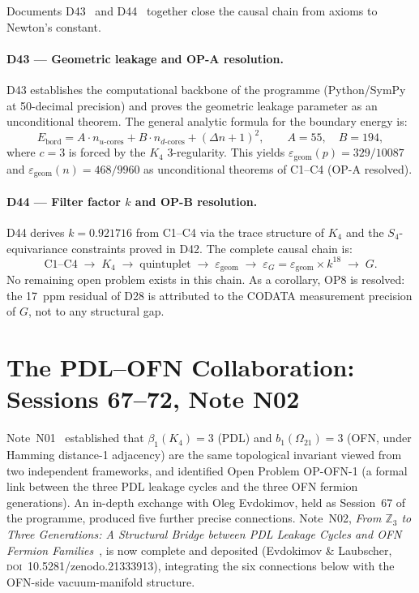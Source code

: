 \documentclass[11pt,a4paper]{article}
\theoremstyle{plain}
\theoremstyle{definition}
\theoremstyle{remark}
\newcommand{\Kfour}{K_4}
\begin{document}
Documents D43~\cite{D43} and D44~\cite{D44} together close the causal chain from axioms to Newton's constant.

\paragraph{D43 --- Geometric leakage and OP-A resolution.} D43 establishes the computational backbone of the programme (Python/SymPy at 50-decimal precision) and proves the geometric leakage parameter as an unconditional theorem. The general analytic formula for the boundary energy is:
\begin{equation}
E_{\mathrm{bord}} = A \cdot n_{u\text{-cores}} + B \cdot n_{d\text{-cores}} + (\Delta n+1)^2, \qquad A = 55,\quad B = 194,
\end{equation}
where $c=3$ is forced by the $K_4$ 3-regularity. This yields $\varepsilon_{\mathrm{geom}}(p) = 329/10087$ and $\varepsilon_{\mathrm{geom}}(n) = 468/9960$ as unconditional theorems of C1--C4 (OP-A resolved).

\paragraph{D44 --- Filter factor $k$ and OP-B resolution.} D44 derives $k = 0.921716$ from C1--C4 via the trace structure of $K_4$ and the $S_4$-equivariance constraints proved in D42. The complete causal chain is:
\begin{equation*}
\text{C1--C4} \;\to\; K_4 \;\to\; \text{quintuplet} \;\to\; \varepsilon_{\mathrm{geom}} \;\to\; \varepsilon_G = \varepsilon_{\mathrm{geom}} \times k^{18} \;\to\; G.
\end{equation*}
No remaining open problem exists in this chain. As a corollary, OP8 is resolved: the 17~ppm residual of D28 is attributed to the CODATA measurement precision of $G$, not to any structural gap.

\section{The PDL--OFN Collaboration: Sessions 67--72, Note N02}
\label{sec:PDLOFN}

Note~N01~\cite{N01} established that $\beta_1(\Kfour)=3$ (PDL) and $b_1(\Omega_{21})=3$ (OFN, under Hamming distance-1 adjacency) are the same topological invariant viewed from two independent frameworks, and identified Open Problem OP-OFN-1 (a formal link between the three PDL leakage cycles and the three OFN fermion generations). An in-depth exchange with Oleg Evdokimov, held as Session~67 of the programme, produced five further precise connections. Note~N02, \emph{From $\mathbb{Z}_3$ to Three Generations: A Structural Bridge between PDL Leakage Cycles and OFN Fermion Families}~\cite{N02}, is now complete and deposited (Evdokimov \& Laubscher, \textsc{doi}~10.5281/zenodo.21333913), integrating the six connections below with the OFN-side vacuum-manifold structure.
\end{document}
